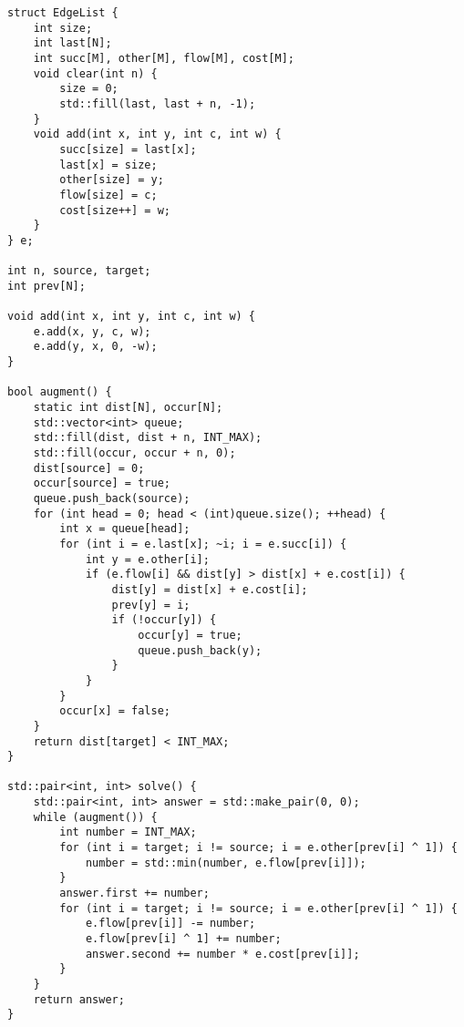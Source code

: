 \begin{lstlisting}
struct EdgeList {
    int size;
    int last[N];
    int succ[M], other[M], flow[M], cost[M];
    void clear(int n) {
        size = 0;
        std::fill(last, last + n, -1);
    }
    void add(int x, int y, int c, int w) {
        succ[size] = last[x];
        last[x] = size;
        other[size] = y;
        flow[size] = c;
        cost[size++] = w;
    }
} e;

int n, source, target;
int prev[N];

void add(int x, int y, int c, int w) {
    e.add(x, y, c, w);
    e.add(y, x, 0, -w);
}

bool augment() {
    static int dist[N], occur[N];
    std::vector<int> queue;
    std::fill(dist, dist + n, INT_MAX);
    std::fill(occur, occur + n, 0);
    dist[source] = 0;
    occur[source] = true;
    queue.push_back(source);
    for (int head = 0; head < (int)queue.size(); ++head) {
        int x = queue[head];
        for (int i = e.last[x]; ~i; i = e.succ[i]) {
            int y = e.other[i];
            if (e.flow[i] && dist[y] > dist[x] + e.cost[i]) {
                dist[y] = dist[x] + e.cost[i];
                prev[y] = i;
                if (!occur[y]) {
                    occur[y] = true;
                    queue.push_back(y);
                }
            }
        }
        occur[x] = false;
    }
    return dist[target] < INT_MAX;
}

std::pair<int, int> solve() {
    std::pair<int, int> answer = std::make_pair(0, 0);
    while (augment()) {
        int number = INT_MAX;
        for (int i = target; i != source; i = e.other[prev[i] ^ 1]) {
            number = std::min(number, e.flow[prev[i]]);
        }
        answer.first += number;
        for (int i = target; i != source; i = e.other[prev[i] ^ 1]) {
            e.flow[prev[i]] -= number;
            e.flow[prev[i] ^ 1] += number;
            answer.second += number * e.cost[prev[i]];
        }
    }
    return answer;
}
\end{lstlisting}

